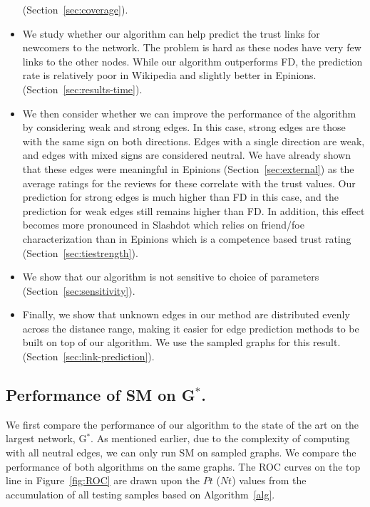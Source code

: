 \documentclass[acmtweb]{acmsmall}
\begin{document}
\begin{itemize}
  (Section~\ref{sec:coverage}).
\item We study whether our algorithm can help predict the trust links
  for newcomers to the network. The problem is hard as these nodes have very few links to the other nodes. While our algorithm outperforms FD, the
  prediction rate is relatively poor in Wikipedia and slightly better
  in Epinions. (Section~\ref{sec:results-time}).
\item We then consider whether we can improve the performance of the
  algorithm by considering weak and strong edges. In this case, strong
  edges are those with the same sign on both directions. Edges with a
  single direction are weak, and edges with mixed signs are considered
  neutral. We have already shown that these edges were meaningful in
  Epinions (Section~\ref{sec:external}) as the average ratings for the
  reviews for these correlate with the trust values. Our prediction
  for strong edges is much higher than FD in this case, and the
  prediction for weak edges still remains higher than FD. In addition,
  this effect becomes more pronounced in Slashdot which relies on
  friend/foe characterization than in Epinions which is a competence
  based trust rating (Section~\ref{sec:tiestrength}).
\item We show that our algorithm is not sensitive to choice of
  parameters (Section~\ref{sec:sensitivity}).
\item Finally, we show that unknown edges in our method are
  distributed evenly across the distance range, making it easier for
  edge prediction methods to be built on top of our algorithm. We use
  the sampled graphs for this
  result. (Section~\ref{sec:link-prediction}).
\end{itemize} 

\subsection{Performance of SM on G$^*$.} \label{sec:gstar-results}
We first compare the performance of our algorithm to the state of the
art on the largest network, G$^*$. As mentioned earlier, due to the
complexity of computing with all neutral edges, we can only run SM on
sampled graphs. We compare the performance of both algorithms on the
same graphs. The ROC curves on the top line in Figure~\ref{fig:ROC} are
drawn upon the $Pt$ ($Nt$) values from the accumulation of all testing
samples based on Algorithm~\ref{alg}.
\end{document}
